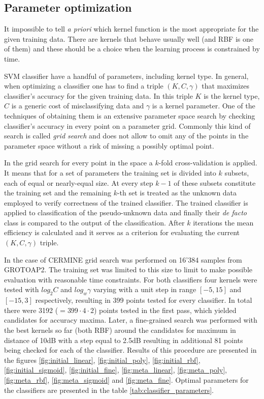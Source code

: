 \subsection{Parameter optimization}
\label{sec:svm_optimization}
It impossible to tell \textit{a priori} which kernel function is the most appropriate for the given training data. There are kernels that behave usually well (and RBF is one of them) and these should be a choice when the learning process is constrained by time.

SVM classifier have a handful of parameters, including kernel type. In general, when optimizing a classifier one has to find a triple $(K, C, \gamma)$ that maximizes classifier's accuracy for the given training data. In this triple $K$ is the kernel type, $C$ is a generic cost of misclassifying data and $\gamma$ is a kernel parameter. One of the techniques of obtaining them is an extensive parameter space search by checking classifier's accuracy in every point on a parameter grid. Commonly this kind of search is called \textit{grid search} and does not allow to omit any of the points in the parameter space without a risk of missing a possibly optimal point.

In the grid search for every point in the space a $k$-fold cross-validation is applied. It means that for a set of parameters the training set is divided into $k$ subsets, each of equal or nearly-equal size. At every step $k-1$ of these subsets constitute the training set and the remaining $k$-th set is treated as the unknown data employed to verify correctness of the trained classifier. The trained classifier is applied to classification of the pseudo-unknown data and finally their \textit{de facto} class is compared to the output of the classification. After $k$ iterations the mean efficiency is calculated and it serves as a criterion for evaluating the current $(K, C, \gamma)$ triple.


In the case of CERMINE grid search was performed on 16'384 samples from GROTOAP2. The training set was limited to this size to limit to make possible evaluation with reasonable time constraints. For both classifiers four kernels were tested with $log_{2}C$ and $log_{w}\gamma$ varying with a unit step in range $[-5,15]$ and $[-15,3]$ respectively, resulting in 399 points tested for every classifier. In total there were 3192 ($=399\cdot4\cdot2$) points tested in the first pass, which yielded candidates for accuracy maxima. Later, a fine-grained search was performed with the best kernels so far (both RBF) around the candidates for maximum in distance of 10dB with a step equal to 2.5dB resulting in additional 81 points being checked for each of the classifier. Results of this procedure are presented in the figures \ref{fig:initial_linear}, \ref{fig:initial_poly}, \ref{fig:initial_rbf}, \ref{fig:initial_sigmoid}, \ref{fig:initial_fine}, \ref{fig:meta_linear}, \ref{fig:meta_poly}, \ref{fig:meta_rbf}, \ref{fig:meta_sigmoid} and \ref{fig:meta_fine}. Optimal parameters for the classifiers are presented in the table \ref{tab:classifier_parameters}.

